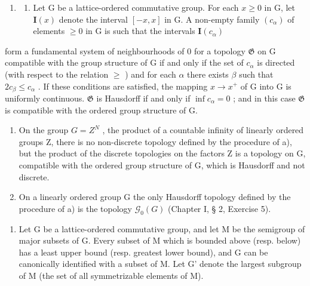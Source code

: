 \begin{enumerate}
\def\labelenumi{\arabic{enumi})}
\setcounter{enumi}{1}
\tightlist
\item
  \begin{enumerate}
  \def\labelenumii{\alph{enumii})}
  \tightlist
  \item
    Let G be a lattice-ordered commutative group. For each \(x \geqslant 0\) in G, let \(\mathbf{I}(x)\) denote the interval \([-x, x]\) in G. A non-empty family \((c_{\alpha})\) of elements \(\geqslant 0\) in G is such that the intervals \(\mathbf{I}(c_{\alpha})\)
  \end{enumerate}
\end{enumerate}

form a fundamental system of neighbourhoods of 0 for a topology \(\mathfrak{G}\) on G compatible with the group structure of G if and only if the set of \(c_{\alpha}\) is directed (with respect to the relation \(\geqslant\) ) and for each \(\alpha\) there exists \(\beta\) such that \(2c_{\beta} \leqslant c_{\alpha}\) . If these conditions are satisfied, the mapping \(x \to x^{+}\) of G into G is uniformly continuous. \(\mathfrak{G}\) is Hausdorff if and only if \(\inf c_{\alpha} = 0\) ; and in this case \(\mathfrak{G}\) is compatible with the ordered group structure of G.

\begin{enumerate}
\def\labelenumi{\alph{enumi})}
\setcounter{enumi}{1}
\item
  On the group \(G = Z^{N}\) , the product of a countable infinity of linearly ordered groups Z, there is no non-discrete topology defined by the procedure of a), but the product of the discrete topologies on the factors Z is a topology on G, compatible with the ordered group structure of G, which is Hausdorff and not discrete.
\item
  On a linearly ordered group G the only Hausdorff topology defined by the procedure of a) is the topology \(\mathcal{G}_{0}(G)\) (Chapter I, § 2, Exercise 5).
\end{enumerate}

\begin{enumerate}
\def\labelenumi{\arabic{enumi})}
\setcounter{enumi}{2}
\tightlist
\item
  Let G be a lattice-ordered commutative group, and let M be the semigroup of major subsets of G. Every subset of M which is bounded above (resp. below) has a least upper bound (resp. greatest lower bound), and G can be canonically identified with a subset of M. Let G' denote the largest subgroup of M (the set of all symmetrizable elements of M).
\end{enumerate}

